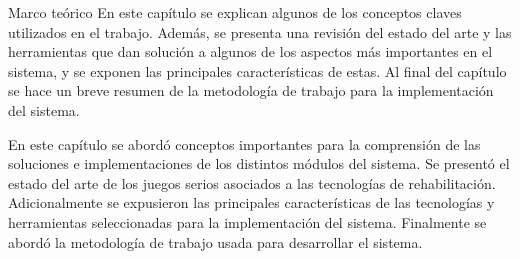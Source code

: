 \begin{thesischapter}{1} {Marco teórico}
En este capítulo se explican algunos de los conceptos claves utilizados en el trabajo. Además, se presenta una revisión del estado del arte y las herramientas que dan solución a algunos de los aspectos más importantes en el sistema, y se exponen las principales características de estas. Al final del capítulo se hace un breve resumen de la metodología de trabajo para la implementación del sistema.











En este capítulo se abordó conceptos importantes para la comprensión de las soluciones e implementaciones de los distintos módulos del sistema. Se presentó el estado del arte de los juegos serios asociados a las tecnologías de rehabilitación. Adicionalmente se expusieron las principales características de las tecnologías y herramientas seleccionadas para la implementación del sistema. Finalmente se abordó la metodología de trabajo usada para desarrollar el sistema. 
\end{thesischapter}